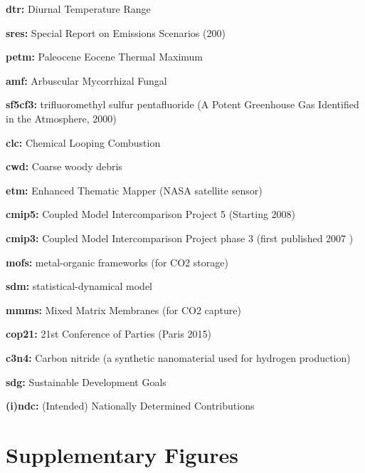 \documentclass{article}
\begin{document}
\begin{linenumbers}
		\noindent\textbf{dtr:} Diurnal Temperature Range
		
		\noindent\textbf{sres:} Special Report on Emissions Scenarios (200)
		
		\noindent\textbf{petm:} Paleocene Eocene Thermal Maximum
		
		\noindent\textbf{amf:}  Arbuscular Mycorrhizal Fungal
		
		\noindent\textbf{sf5cf3:} trifluoromethyl sulfur pentafluoride (A Potent Greenhouse Gas Identified in the Atmosphere, 2000)
		
		\noindent\textbf{clc:} Chemical Looping Combustion
		
		\noindent\textbf{cwd:} Coarse woody debris
		
		\noindent\textbf{etm:} Enhanced Thematic Mapper (NASA satellite sensor)
		
		\noindent\textbf{cmip5:} Coupled Model Intercomparison Project 5 (Starting 2008)
		
		\noindent\textbf{cmip3:} Coupled Model Intercomparison Project phase 3 (first published 2007 \cite{Meehl2007})
		
		\noindent\textbf{mofs:} metal-organic frameworks (for CO2 storage)
		
		\noindent\textbf{sdm:} statistical-dynamical model
		
		\noindent\textbf{mmms:} Mixed Matrix Membranes (for CO2 capture)
		
		\noindent\textbf{cop21:} 21st Conference of Parties (Paris 2015) 
		
		\noindent\textbf{c3n4:} Carbon nitride (a synthetic nanomaterial used for hydrogen production)
		
		\noindent\textbf{sdg:} Sustainable Development Goals
		
		\noindent\textbf{(i)ndc:} (Intended) Nationally Determined Contributions
		
		
	\end{linenumbers}
	
	\linespread{1}
	

	
	\section*{Supplementary Figures}
	
			\setcounter{figure}{0}
	\renewcommand\thefigure{SI.\arabic{figure}}  
	
\end{document}
